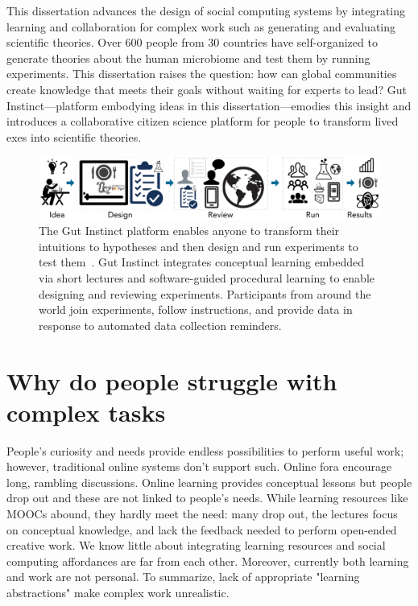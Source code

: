 This dissertation advances the design of social computing systems by integrating learning and collaboration for complex work such as generating and evaluating scientific theories. Over 600 people from 30 countries have self-organized to generate theories about the human microbiome and test them by running experiments. This dissertation raises the question: how can global communities create knowledge that meets their goals without waiting for experts to lead? Gut Instinct---platform embodying ideas in this dissertation---emodies this insight and introduces a collaborative citizen science platform for people to transform lived exes into scientific theories. 

\begin{figure}[b] 
  \centering
  \includegraphics[width=1.0\textwidth]{figures/intro/intro-1}
  \caption[The Gut Instinct platform enables anyone to transform their intuitions to hypotheses 
and then design and run experiments to test them]
{The Gut Instinct platform enables anyone to transform their intuitions to hypotheses 
and then design and run experiments to test them~\cite{Pandey, Pandey2017,Pandey2018}. Gut Instinct integrates 
conceptual learning embedded via short lectures and software-guided procedural 
learning to enable designing and reviewing experiments. Participants from around
 the world join experiments, follow instructions, and provide data in response to 
automated data collection reminders. }
  \label{fig:intro-1}
\end{figure}

\section {Why do people struggle with complex tasks}
People’s curiosity and needs provide endless possibilities to perform useful work; however, traditional online systems don’t support such. Online fora encourage long, rambling discussions. Online learning provides conceptual lessons but people drop out and these are not linked to people’s needs. While learning resources like MOOCs abound, they hardly meet the need: many drop out, the lectures focus on conceptual knowledge, and lack the feedback needed to perform open-ended creative work. We know little about integrating learning resources and social computing affordances are far from each other. Moreover, currently both learning and work are not personal. To summarize, lack of appropriate "learning abstractions" make complex work unrealistic.


